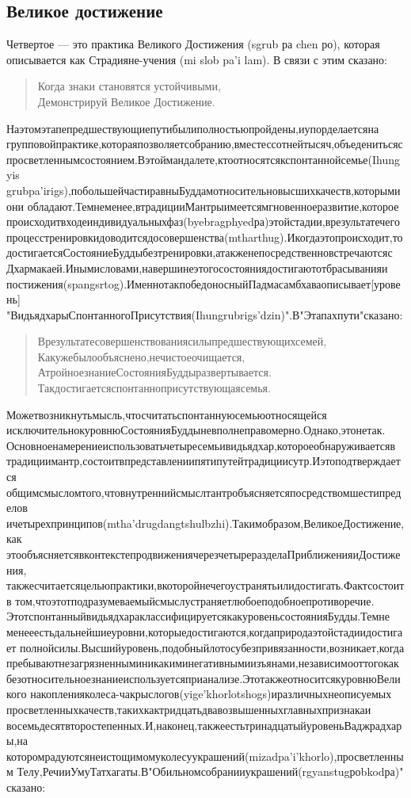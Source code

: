 \subsection{Великое достижение}
Четвертое — это практика Великого Достижения (sgrub ра chen ро), которая
описывается как Страдияне-учения (mi slob pa'i lam). В связи с этим сказано:
\begin{verse}
Когда знаки становятся устойчивыми,\\
Демонстрируй Великое Достижение.
\end{verse}
Наэтомэтапепредшествующиепутибылиполностьюпройдены,иупорделаетсяна
групповойпрактике,котораяпозволяетсобранию,вместессотнейтысяч,объеденитьсяс
просветленнымсостоянием.Вэтоймандалете,ктоотносятсякспонтаннойсемье(Ihungyis
grubpa'irigs),побольшейчастиравныБуддамотносительновысшихкачеств,которымиони
обладают.Темнеменее,втрадицииМантрыимеетсямгновенноеразвитие,которое
происходитвходеиндивидуальныхфаз(byebragphyedра)этойстадии,врезультатечего
процесстренировкидоводитсядосовершенства(mtharthug).Икогдаэтопроисходит,то
достигаетсяСостояниеБуддыбезтренировки,атакженепосредственновстречаютсяс
Дхармакаей.Инымисловами,навершинеэтогосостояниядостигаютотбрасыванияи
постижения(spangsrtog).ИменнотакпобедоносныйПадмасамбхаваописывает[уровень]
"ВидьядхарыСпонтанногоПрисутствия(Ihungrubrigs'dzin)".В"Этапахпути"сказано:
\begin{verse}
Врезультатесовершенствованиясилыпредшествующихсемей,
Какужебылообъяснено,нечистоеочищается,
АтройноезнаниеСостоянияБуддыразвертывается.
Такдостигаетсяспонтанноприсутствующаясемья.
\end{verse}
Можетвозникнутьмысль,чтосчитатьспонтаннуюсемьюотносящейся
исключительнокуровнюСостоянияБуддыневполнеправомерно.Однако,этонетак.
Основноенамерениеиспользоватьчетыресемьивидьядхар,котороеобнаруживаетсяв
традициимантр,состоитвпредставлениипятипутейтрадициисутр.Иэтоподтверждается
общимсмысломтого,чтовнутреннийсмыслтантробъясняетсяпосредствомшестипределов
ичетырехпринципов(mtha'drugdangtshulbzhi).Такимобразом,ВеликоеДостижение,как
этообъясняетсявконтекстепродвижениячерезчетыреразделаПриближенияиДостижения,
такжесчитаетсяцельюпрактики,вкоторойнечегоустранятьилидостигать.Фактсостоитв
том,чтоэтотподразумеваемыйсмыслустраняетлюбоеподобноепротиворечие.
ЭтотспонтанныйвидьядхараклассифицируетсякакуровеньсостоянияБудды.Темне
менееестьдальнейшиеуровни,которыедостигаются,когдаприродаэтойстадиидостигает
полнойсилы.Высшийуровень,подобныйлотосубезпривязанности,возникает,когда
пребываютнезагрязненныминикакиминегативнымиизъянами,независимооттогокак
безотносительноезнаниеиспользуетсяприанализе.ЭтотакжеотноситсякуровнюВеликого
накопленияколеса-чакрыслогов(yige'khorlotshogs)иразличныхнеописуемых
просветленныхкачеств,такихкактридцатьдвавозвышенныхглавныхпризнакаи
восемьдесятвторостепенных.И,наконец,такжеестьтринадцатыйуровеньВаджрадхары,на
которомрадуютсянеистощимомуколесуукрашений(mizadpa'i'khorlo),просветленным
Телу,РечииУмуТатхагаты.В"Обильномсобранииукрашений(rgyanstugроbkodра)"
сказано:

